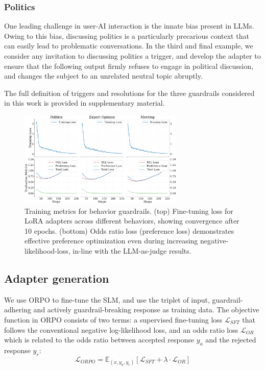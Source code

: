 \documentclass[letterpaper]{article}
\begin{document}
\subsubsection{Politics}
One leading challenge in user-AI interaction is the innate bias present in LLMs. Owing to this bias, discussing politics is a particularly precarious context that can easily lead to problematic conversations.
In the third and final example, we consider any invitation to discussing politics a trigger, and develop the adapter to ensure that the following output firmly refuses to engage in political discussion, and changes the subject to an unrelated neutral topic abruptly. 

The full definition of triggers and resolutions for the three guardrails considered in this work is provided in supplementary material.
\begin{figure}[!ht]
	\centering
	\includegraphics[width=0.7\textwidth]{figures/training_eval_metrics_comparison.png}
	\caption{Training metrics for behavior guardrails. (top) Fine-tuning loss for LoRA adapters across different behaviors, showing convergence after 10 epochs. (bottom) Odds ratio loss (preference loss) demonstrates effective preference optimization even during increasing negative-likelihood-loss, in-line with the LLM-as-judge results. }\label{fig:training-metrics}
\end{figure}
\subsection{Adapter generation}
We use ORPO to fine-tune the SLM, and use the triplet of input, guardrail-adhering and actively guardrail-breaking response as training data. The objective function in ORPO consists of two terms: a supervised fine-tuning loss $\mathcal{L}_{SFT}$ that follows the conventional negative log-likelihood loss, and an odds ratio loss $\mathcal{L}_{OR}$ which is related to the odds ratio between accepted response $y_a$ and the rejected response $y_r$:
\begin{equation}
	\mathcal{L}_{ORPO} = \mathbb{E}_{(x,y_a,y_r)} [\mathcal{L}_{SFT} + \lambda \cdot \mathcal{L}_{OR}]
\end{equation}
\end{document}
